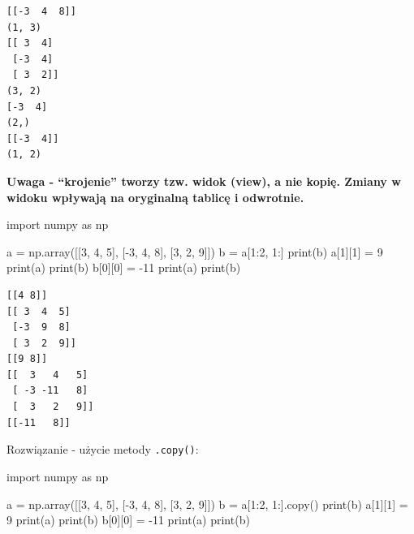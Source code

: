 \documentclass[
  polish,
  letterpaper,
  DIV=11,
  numbers=noendperiod]{scrreprt}
\newenvironment{Shaded}{\begin{snugshade}}{\end{snugshade}}
\newcommand{\BuiltInTok}[1]{\textcolor[rgb]{0.00,0.23,0.31}{#1}}
\newcommand{\DecValTok}[1]{\textcolor[rgb]{0.68,0.00,0.00}{#1}}
\newcommand{\ImportTok}[1]{\textcolor[rgb]{0.00,0.46,0.62}{#1}}
\newcommand{\NormalTok}[1]{\textcolor[rgb]{0.00,0.23,0.31}{#1}}
\newcommand{\OperatorTok}[1]{\textcolor[rgb]{0.37,0.37,0.37}{#1}}
\begin{document}
\begin{verbatim}
[[-3  4  8]]
(1, 3)
[[ 3  4]
 [-3  4]
 [ 3  2]]
(3, 2)
[-3  4]
(2,)
[[-3  4]]
(1, 2)
\end{verbatim}

\textbf{Uwaga - ``krojenie'' tworzy tzw. widok (view), a nie kopię.
Zmiany w widoku wpływają na oryginalną tablicę i odwrotnie.}

\begin{Shaded}
\begin{Highlighting}[]
\ImportTok{import}\NormalTok{ numpy }\ImportTok{as}\NormalTok{ np}

\NormalTok{a }\OperatorTok{=}\NormalTok{ np.array([[}\DecValTok{3}\NormalTok{, }\DecValTok{4}\NormalTok{, }\DecValTok{5}\NormalTok{], [}\OperatorTok{{-}}\DecValTok{3}\NormalTok{, }\DecValTok{4}\NormalTok{, }\DecValTok{8}\NormalTok{], [}\DecValTok{3}\NormalTok{, }\DecValTok{2}\NormalTok{, }\DecValTok{9}\NormalTok{]])}
\NormalTok{b }\OperatorTok{=}\NormalTok{ a[}\DecValTok{1}\NormalTok{:}\DecValTok{2}\NormalTok{, }\DecValTok{1}\NormalTok{:]}
\BuiltInTok{print}\NormalTok{(b)}
\NormalTok{a[}\DecValTok{1}\NormalTok{][}\DecValTok{1}\NormalTok{] }\OperatorTok{=} \DecValTok{9}
\BuiltInTok{print}\NormalTok{(a)}
\BuiltInTok{print}\NormalTok{(b)}
\NormalTok{b[}\DecValTok{0}\NormalTok{][}\DecValTok{0}\NormalTok{] }\OperatorTok{=} \OperatorTok{{-}}\DecValTok{11}
\BuiltInTok{print}\NormalTok{(a)}
\BuiltInTok{print}\NormalTok{(b)}
\end{Highlighting}
\end{Shaded}

\begin{verbatim}
[[4 8]]
[[ 3  4  5]
 [-3  9  8]
 [ 3  2  9]]
[[9 8]]
[[  3   4   5]
 [ -3 -11   8]
 [  3   2   9]]
[[-11   8]]
\end{verbatim}

Rozwiązanie - użycie metody \texttt{.copy()}:

\begin{Shaded}
\begin{Highlighting}[]
\ImportTok{import}\NormalTok{ numpy }\ImportTok{as}\NormalTok{ np}

\NormalTok{a }\OperatorTok{=}\NormalTok{ np.array([[}\DecValTok{3}\NormalTok{, }\DecValTok{4}\NormalTok{, }\DecValTok{5}\NormalTok{], [}\OperatorTok{{-}}\DecValTok{3}\NormalTok{, }\DecValTok{4}\NormalTok{, }\DecValTok{8}\NormalTok{], [}\DecValTok{3}\NormalTok{, }\DecValTok{2}\NormalTok{, }\DecValTok{9}\NormalTok{]])}
\NormalTok{b }\OperatorTok{=}\NormalTok{ a[}\DecValTok{1}\NormalTok{:}\DecValTok{2}\NormalTok{, }\DecValTok{1}\NormalTok{:].copy()}
\BuiltInTok{print}\NormalTok{(b)}
\NormalTok{a[}\DecValTok{1}\NormalTok{][}\DecValTok{1}\NormalTok{] }\OperatorTok{=} \DecValTok{9}
\BuiltInTok{print}\NormalTok{(a)}
\BuiltInTok{print}\NormalTok{(b)}
\NormalTok{b[}\DecValTok{0}\NormalTok{][}\DecValTok{0}\NormalTok{] }\OperatorTok{=} \OperatorTok{{-}}\DecValTok{11}
\BuiltInTok{print}\NormalTok{(a)}
\BuiltInTok{print}\NormalTok{(b)}
\end{Highlighting}
\end{Shaded}
\end{document}
